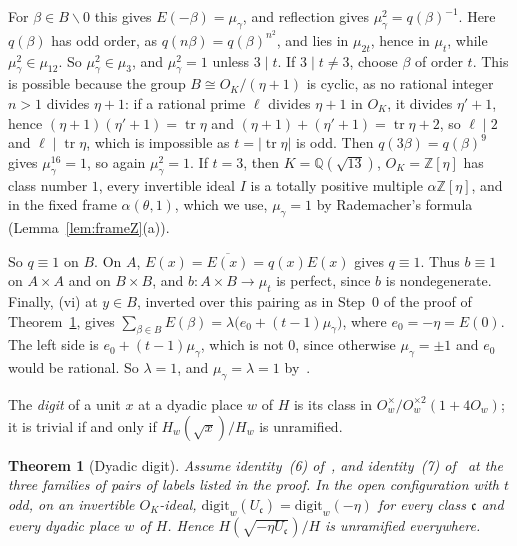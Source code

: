 \documentclass[11pt]{amsart}
\numberwithin{equation}{section}
\theoremstyle{plain}
\newtheorem{theorem}{Theorem}[section]
\theoremstyle{definition}
\theoremstyle{remark}
\newcommand{\tr}{\operatorname{tr}}
\begin{document}
For \(\beta\in B\smallsetminus0\) this gives \(E(-\beta)=\mu_\gamma\), and reflection gives \(\mu_\gamma^2=q(\beta)^{-1}\). Here \(q(\beta)\) has odd order, as \(q(n\beta)=q(\beta)^{n^2}\), and lies in \(\mu_{2t}\), hence in \(\mu_t\), while \(\mu_\gamma^2\in\mu_{12}\). So \(\mu_\gamma^2\in\mu_3\), and \(\mu_\gamma^2=1\) unless \(3\mid t\). If \(3\mid t\ne3\), choose \(\beta\) of order \(t\). This is possible because the group \(B\cong O_K/(\eta+1)\) is cyclic, as no rational integer \(n>1\) divides \(\eta+1\): if a rational prime \(\ell\) divides \(\eta+1\) in \(O_K\), it divides \(\eta'+1\), hence \((\eta+1)(\eta'+1)=\tr\eta\) and \((\eta+1)+(\eta'+1)=\tr\eta+2\), so \(\ell\mid2\) and \(\ell\mid\tr\eta\), which is impossible as \(t=|\tr\eta|\) is odd. Then \(q(3\beta)=q(\beta)^9\) gives \(\mu_\gamma^{16}=1\), so again \(\mu_\gamma^2=1\). If \(t=3\), then \(K=\mathbb Q(\sqrt{13})\), \(O_K=\mathbb Z[\eta]\) has class number \(1\), every invertible ideal \(I\) is a totally positive multiple \(\alpha\mathbb Z[\eta]\), and in the fixed frame \(\alpha(\theta,1)\), which we use, \(\mu_\gamma=1\) by Rademacher's formula (Lemma~\ref{lem:frameZ}(a)).

So \(q\equiv1\) on \(B\). On \(A\), \(E(x)=\overline{E(x)}=q(x)E(x)\) gives \(q\equiv1\). Thus \(b\equiv1\) on \(A\times A\) and on \(B\times B\), and \(b:A\times B\to\mu_t\) is perfect, since \(b\) is nondegenerate. Finally, (vi) at \(y\in B\), inverted over this pairing as in Step~0 of the proof of Theorem~\ref{thm:dyadic}, gives \(\sum_{\beta\in B}E(\beta)=\lambda\bigl(e_0+(t-1)\mu_\gamma\bigr)\), where \(e_0=-\eta=E(0)\). The left side is \(e_0+(t-1)\mu_\gamma\), which is not \(0\), since otherwise \(\mu_\gamma=\pm1\) and \(e_0\) would be rational. So \(\lambda=1\), and \(\mu_\gamma=\lambda=1\) by~\cite[(6)]{RW}.

The \emph{digit} of a unit \(x\) at a dyadic place \(w\) of \(H\) is its class in \(O_w^\times/O_w^{\times2}(1+4O_w)\); it is trivial if and only if \(H_w(\sqrt x)/H_w\) is unramified.

\begin{theorem}[Dyadic digit]\label{thm:dyadic}
Assume identity~(6) of~\cite{RW}, and identity~(7) of~\cite{RW} at the three families of pairs of labels listed in the proof. In the open configuration with \(t\) odd, on an invertible \(O_K\)-ideal, \(\mathrm{digit}_w(U_{\mathfrak c})=\mathrm{digit}_w(-\eta)\) for every class \(\mathfrak c\) and every dyadic place \(w\) of \(H\). Hence \(H(\sqrt{-\eta U_{\mathfrak c}})/H\) is unramified everywhere.
\end{theorem}
\end{document}
